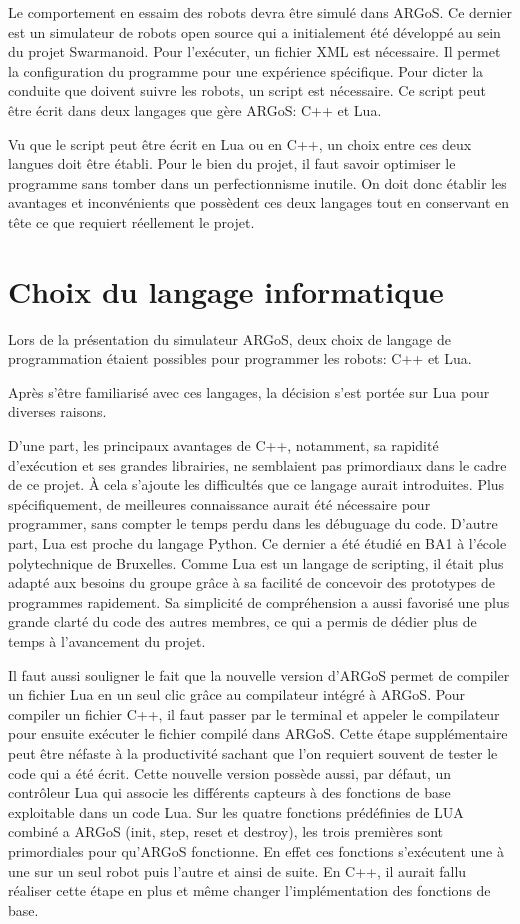 \documentclass[a4paper]{report}
\begin{document}
Le comportement en essaim des robots devra être simulé dans ARGoS. Ce dernier est un simulateur de robots open source qui a initialement été développé au sein du projet Swarmanoid. Pour l'exécuter, un fichier XML est nécessaire. Il permet la configuration du programme pour une expérience spécifique. Pour dicter la conduite que doivent suivre les robots, un script est nécessaire. Ce script peut être écrit dans deux langages que gère ARGoS: C++ et Lua.

Vu que le script peut être écrit en Lua ou en C++, un choix entre ces deux langues doit être établi. Pour le bien du projet, il faut savoir optimiser le programme sans tomber dans un perfectionnisme inutile. On doit donc établir les avantages et inconvénients que possèdent ces deux langages tout en conservant en tête ce que requiert réellement le projet.

\chapter{Choix du langage informatique}

Lors de la présentation du simulateur ARGoS, deux choix de langage de programmation étaient possibles pour programmer les robots: C++ et Lua.

Après s’être familiarisé avec ces langages, la décision s'est portée sur Lua pour diverses raisons.

D'une part, les principaux avantages de C++, notamment, sa rapidité d’exécution et ses grandes librairies, ne semblaient pas primordiaux dans le cadre de ce projet. À cela s'ajoute les difficultés que ce langage aurait introduites. Plus spécifiquement, de meilleures connaissance aurait été nécessaire pour programmer, sans compter le temps perdu dans les débuguage du code.
D'autre part, Lua est proche du langage Python. Ce dernier a été étudié en BA1 à l'école polytechnique de Bruxelles. Comme Lua est un langage de scripting, il était plus adapté aux besoins du groupe grâce à sa facilité de concevoir des prototypes de programmes rapidement. Sa simplicité de compréhension a aussi favorisé une plus grande clarté du code des autres membres, ce qui a permis de dédier plus de temps à l’avancement du projet.\cite{compC++,compLua}

Il faut aussi souligner le fait que la nouvelle version d'ARGoS permet de compiler un fichier Lua en un seul clic grâce au compilateur intégré à ARGoS. Pour compiler un fichier C++, il faut passer par le terminal et appeler le compilateur pour ensuite exécuter le fichier compilé dans ARGoS. Cette étape supplémentaire peut être néfaste à la productivité sachant que l'on requiert souvent de tester le code qui a été écrit. Cette nouvelle version possède aussi, par défaut, un contrôleur Lua qui associe les différents capteurs à des fonctions de base exploitable dans un code Lua. Sur les quatre fonctions prédéfinies de LUA combiné a ARGoS (init, step, reset et destroy), les trois premières sont primordiales pour qu'ARGoS fonctionne. En effet ces fonctions s’exécutent une à une sur un seul robot puis l'autre et ainsi de suite. En C++, il aurait fallu réaliser cette étape en plus et même changer l'implémentation des fonctions de base.
\end{document}
